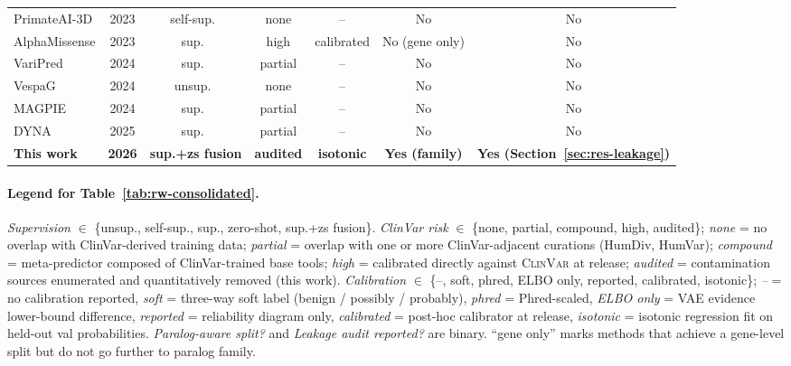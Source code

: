 \documentclass[11pt,a4paper,oneside]{report}
\begin{document}
\begin{table}[htbp]
{\begin{tabular}{@{} l c c c c c c @{}}
PrimateAI-3D   & 2023  & self-sup.\   & none     & --          & No             & No       \\
AlphaMissense  & 2023  & sup.\        & high     & calibrated  & No (gene only) & No       \\
VariPred       & 2024  & sup.\        & partial  & --          & No             & No       \\
VespaG         & 2024  & unsup.\      & none     & --          & No             & No       \\
MAGPIE         & 2024  & sup.\        & partial  & --          & No             & No       \\
DYNA           & 2025  & sup.\        & partial  & --          & No             & No       \\
\midrule
\textbf{This work} & \textbf{2026} & \textbf{sup.+zs fusion}
 & \textbf{audited} & \textbf{isotonic}
 & \textbf{Yes (family)} & \textbf{Yes (Section~\ref{sec:res-leakage})} \\
\bottomrule
\end{tabular}%
}
\end{table}

\paragraph{Legend for Table~\ref{tab:rw-consolidated}.}
\emph{Supervision} $\in$ \{unsup., self-sup., sup., zero-shot, sup.+zs fusion\}.
\emph{ClinVar risk} $\in$ \{none, partial, compound, high, audited\};
\emph{none} = no overlap with ClinVar-derived training data;
\emph{partial} = overlap with one or more ClinVar-adjacent
curations (HumDiv, HumVar); \emph{compound} = meta-predictor
composed of ClinVar-trained base tools; \emph{high} = calibrated
directly against \textsc{ClinVar} at release;
\emph{audited} = contamination sources enumerated and
quantitatively removed (this work).
\emph{Calibration} $\in$ \{--, soft, phred, ELBO only, reported,
calibrated, isotonic\}; \emph{--} = no calibration reported,
\emph{soft} = three-way soft label (benign / possibly / probably),
\emph{phred} = Phred-scaled, \emph{ELBO only} = VAE evidence
lower-bound difference, \emph{reported} = reliability diagram
only, \emph{calibrated} = post-hoc calibrator at release,
\emph{isotonic} = isotonic regression fit on held-out val
probabilities.
\emph{Paralog-aware split?} and \emph{Leakage audit reported?}
are binary. ``gene only'' marks methods that achieve a
gene-level split but do not go further to paralog family.
\end{document}
